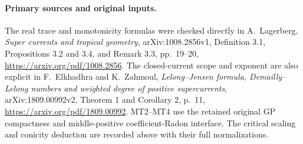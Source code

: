 \paragraph{Primary sources and original inputs.}
The real trace and monotonicity formulas were checked
directly in A.~Lagerberg, \emph{Super currents and tropical
geometry}, arXiv:1008.2856v1, Definition 3.1,
Propositions 3.2 and 3.4, and Remark 3.3, pp.~19--20,
\url{https://arxiv.org/pdf/1008.2856}.  The closed-current
scope and exponent are also explicit in F.~Elkhadhra
and K.~Zahmoul, \emph{Lelong--Jensen formula,
Demailly--Lelong numbers and weighted degree of positive
supercurrents}, arXiv:1809.00992v2, Theorem 1 and
Corollary 2, p.~11,
\url{https://arxiv.org/pdf/1809.00992}.  MT2--MT4 use
the retained original GP compactness and middle-positive
coefficient-Radon interface.  The critical scaling and
conicity deduction are recorded above with their full
normalizations.
